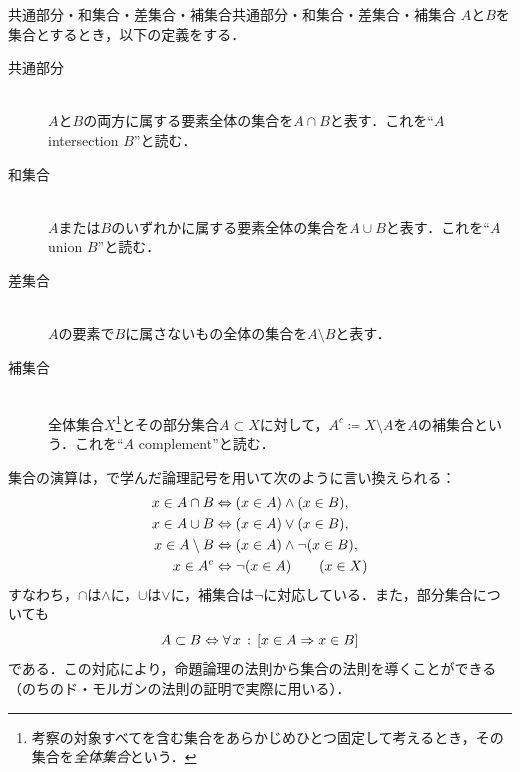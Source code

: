 \begin{definition}{共通部分・和集合・差集合・補集合}{共通部分・和集合・差集合・補集合}
  $A$と$B$を集合とするとき，以下の定義をする．
  \begin{description}
    \item[共通部分]\mbox{}\\
          $A$と$B$の両方に属する要素全体の集合を$A \cap B$と表す．これを``$A$ intersection $B$''と読む．
    \item[和集合]\mbox{}\\
          $A$または$B$のいずれかに属する要素全体の集合を$A \cup B$と表す．これを``$A$ union $B$''と読む．
    \item[差集合]\mbox{}\\
          $A$の要素で$B$に属さないもの全体の集合を$A \setminus B$と表す．
    \item[補集合]\mbox{}\\
          全体集合$X$\footnote{考察の対象すべてを含む集合をあらかじめひとつ固定して考えるとき，その集合を\emph{全体集合}という．}とその部分集合$A \subset X$に対して，$A^c \coloneqq X \setminus A$を$A$の補集合という．これを``$A$ complement''と読む．
  \end{description}
\end{definition}

\begin{remark}[論理記号による言い換え]
  集合の演算は，で学んだ論理記号を用いて次のように言い換えられる：
  \begin{align*}
    x \in A \cap B & \mathrel{\Leftrightarrow} (x \in A) \land (x \in B), \\
    x \in A \cup B & \mathrel{\Leftrightarrow} (x \in A) \lor (x \in B), \\
    x \in A \setminus B & \mathrel{\Leftrightarrow} (x \in A) \land \lnot (x \in B), \\
    x \in A^c & \mathrel{\Leftrightarrow} \lnot (x \in A) \qquad (x \in X)
  \end{align*}
  すなわち，$\cap$は$\land$に，$\cup$は$\lor$に，補集合は$\lnot$に対応している．また，部分集合についても
  \[
    A \subset B \mathrel{\Leftrightarrow} \forall\, x \,:\, [ x \in A \mathrel{\Rightarrow} x \in B ]
  \]
  である．この対応により，命題論理の法則から集合の法則を導くことができる（のちのド・モルガンの法則の証明で実際に用いる）．
\end{remark}


